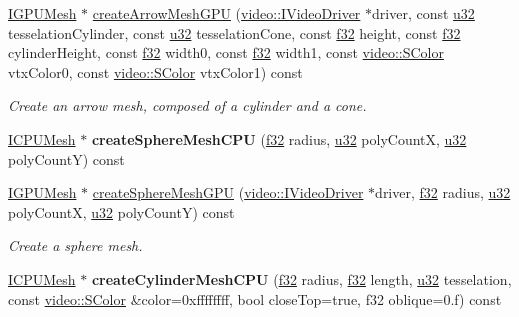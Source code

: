 \begin{DoxyCompactItemize}
\item 
\hyperlink{classirr_1_1scene_1_1IMesh}{I\+G\+P\+U\+Mesh} $\ast$ \hyperlink{classirr_1_1scene_1_1CGeometryCreator_a2409f4deb5ede1eec584137928b4bdb5}{create\+Arrow\+Mesh\+G\+PU} (\hyperlink{classirr_1_1video_1_1IVideoDriver}{video\+::\+I\+Video\+Driver} $\ast$driver, const \hyperlink{namespaceirr_a0416a53257075833e7002efd0a18e804}{u32} tesselation\+Cylinder, const \hyperlink{namespaceirr_a0416a53257075833e7002efd0a18e804}{u32} tesselation\+Cone, const \hyperlink{namespaceirr_a0277be98d67dc26ff93b1a6a1d086b07}{f32} height, const \hyperlink{namespaceirr_a0277be98d67dc26ff93b1a6a1d086b07}{f32} cylinder\+Height, const \hyperlink{namespaceirr_a0277be98d67dc26ff93b1a6a1d086b07}{f32} width0, const \hyperlink{namespaceirr_a0277be98d67dc26ff93b1a6a1d086b07}{f32} width1, const \hyperlink{classirr_1_1video_1_1SColor}{video\+::\+S\+Color} vtx\+Color0, const \hyperlink{classirr_1_1video_1_1SColor}{video\+::\+S\+Color} vtx\+Color1) const 
\begin{DoxyCompactList}\small\item\em Create an arrow mesh, composed of a cylinder and a cone. \end{DoxyCompactList}\item 
\hyperlink{classirr_1_1scene_1_1IMesh}{I\+C\+P\+U\+Mesh} $\ast$ {\bfseries create\+Sphere\+Mesh\+C\+PU} (\hyperlink{namespaceirr_a0277be98d67dc26ff93b1a6a1d086b07}{f32} radius, \hyperlink{namespaceirr_a0416a53257075833e7002efd0a18e804}{u32} poly\+CountX, \hyperlink{namespaceirr_a0416a53257075833e7002efd0a18e804}{u32} poly\+CountY) const \hypertarget{classirr_1_1scene_1_1CGeometryCreator_a6fe2ddebda8cfb001b47912d05113c49}{}\label{classirr_1_1scene_1_1CGeometryCreator_a6fe2ddebda8cfb001b47912d05113c49}

\item 
\hyperlink{classirr_1_1scene_1_1IMesh}{I\+G\+P\+U\+Mesh} $\ast$ \hyperlink{classirr_1_1scene_1_1CGeometryCreator_a3dd60997db6232e563cba44eb3c0880f}{create\+Sphere\+Mesh\+G\+PU} (\hyperlink{classirr_1_1video_1_1IVideoDriver}{video\+::\+I\+Video\+Driver} $\ast$driver, \hyperlink{namespaceirr_a0277be98d67dc26ff93b1a6a1d086b07}{f32} radius, \hyperlink{namespaceirr_a0416a53257075833e7002efd0a18e804}{u32} poly\+CountX, \hyperlink{namespaceirr_a0416a53257075833e7002efd0a18e804}{u32} poly\+CountY) const 
\begin{DoxyCompactList}\small\item\em Create a sphere mesh. \end{DoxyCompactList}\item 
\hyperlink{classirr_1_1scene_1_1IMesh}{I\+C\+P\+U\+Mesh} $\ast$ {\bfseries create\+Cylinder\+Mesh\+C\+PU} (\hyperlink{namespaceirr_a0277be98d67dc26ff93b1a6a1d086b07}{f32} radius, \hyperlink{namespaceirr_a0277be98d67dc26ff93b1a6a1d086b07}{f32} length, \hyperlink{namespaceirr_a0416a53257075833e7002efd0a18e804}{u32} tesselation, const \hyperlink{classirr_1_1video_1_1SColor}{video\+::\+S\+Color} \&color=0xffffffff, bool close\+Top=true, f32 oblique=0.\+f) const \hypertarget{classirr_1_1scene_1_1CGeometryCreator_a9cd6309163a191f7fcf73c81bfee5f09}{}\label{classirr_1_1scene_1_1CGeometryCreator_a9cd6309163a191f7fcf73c81bfee5f09}


\end{DoxyCompactItemize}
